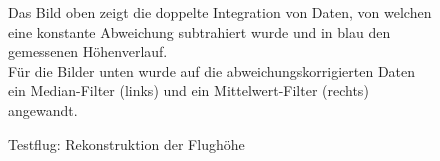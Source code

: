 \begin{figure}[ht!]
\vspace{0.25cm}
\begin{center}
\caption{Testflug: Rekonstruktion der Flughöhe}
\label{fig:FlightHeightReconst}
\end{center}

\vspace{0.25cm}
Das Bild oben zeigt die doppelte Integration von Daten, von welchen eine konstante Abweichung subtrahiert wurde und in blau den gemessenen Höhenverlauf.\\
Für die Bilder unten wurde auf die abweichungskorrigierten Daten ein Median-Filter (links) und ein Mittelwert-Filter (rechts) angewandt.
\end{figure}






